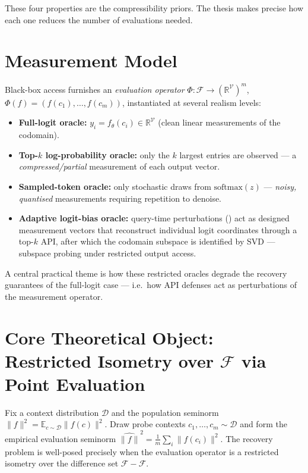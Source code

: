 \documentclass[11pt,a4paper]{article}
\theoremstyle{definition}
\newcommand{\Voc}{\mathcal{V}}
\newcommand{\Fclass}{\mathcal{F}}
\newcommand{\RR}{\mathbb{R}}
\newcommand{\EE}{\mathbb{E}}
\begin{document}
These four properties are the compressibility priors. The thesis makes precise
how each one reduces the number of evaluations needed.

\section{Measurement Model}

Black-box access furnishes an \emph{evaluation operator}
$\Phi:\Fclass\to(\RR^{\Voc})^m$, $\Phi(f)=(f(c_1),\dots,f(c_m))$, instantiated at
several realism levels:

\begin{itemize}[leftmargin=*]
  \item \textbf{Full-logit oracle:} $y_i=f_\theta(c_i)\in\RR^{\Voc}$ (clean linear
  measurements of the codomain).
  \item \textbf{Top-$k$ log-probability oracle:} only the $k$ largest entries are
  observed --- a \emph{compressed/partial} measurement of each output vector.
  \item \textbf{Sampled-token oracle:} only stochastic draws from
  $\mathrm{softmax}(z)$ --- \emph{noisy, quantised} measurements requiring
  repetition to denoise.
  \item \textbf{Adaptive logit-bias oracle:} query-time perturbations
  (\citet{carlini2024stealing}) act as designed measurement vectors that
  reconstruct individual logit coordinates through a top-$k$ API, after which the
  codomain subspace is identified by SVD --- subspace probing under restricted
  output access.
\end{itemize}

A central practical theme is how these restricted oracles degrade the recovery
guarantees of the full-logit case --- i.e.\ how API defenses act as perturbations
of the measurement operator.

\section{Core Theoretical Object: Restricted Isometry over $\Fclass$ via Point Evaluation}
\label{sec:rip}

Fix a context distribution $\mathcal{D}$ and the population seminorm
$\|f\|^2=\EE_{c\sim\mathcal{D}}\|f(c)\|^2$. Draw probe contexts
$c_1,\dots,c_m\sim\mathcal{D}$ and form the empirical evaluation seminorm
$\widehat{\|f\|}^2=\tfrac1m\sum_i\|f(c_i)\|^2$. The recovery problem is well-posed
precisely when the evaluation operator is a restricted isometry over the
difference set $\Fclass-\Fclass$.
\end{document}
